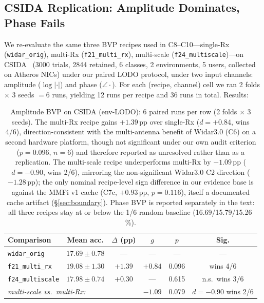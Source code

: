 \documentclass[journal,11pt]{IEEEtran}
\begin{document}
\subsection{CSIDA Replication: Amplitude Dominates, Phase Fails}
\label{sec:csida}

We re-evaluate the same three BVP recipes used in C8--C10---single-Rx (\texttt{widar\_orig}), multi-Rx (\texttt{f21\_multi\_rx}), multi-scale (\texttt{f24\_multiscale})---on CSIDA~\cite{csida2022} (3000 trials, 2844 retained, 6 classes, 2 environments, 5 users, collected on Atheros NICs) under our paired LODO protocol, under two input channels: amplitude ($\log|\cdot|$) and phase ($\angle \cdot$). For each (recipe, channel) cell we ran 2 folds $\times$ 3 seeds $= 6$ runs, yielding 12 runs per recipe and 36 runs in total. Results:

\begin{table}[!t]
    \centering
    \caption{Amplitude BVP on CSIDA (env-LODO): 6 paired runs per row (2 folds $\times$ 3 seeds). The multi-Rx recipe gains $+1.39$\,pp over single-Rx ($d{=}+0.84$, wins 4/6), direction-consistent with the multi-antenna benefit of Widar3.0 (C6) on a second hardware platform, though not significant under our own audit criterion ($p = 0.096$, $n = 6$) and therefore reported as unresolved rather than as a replication. The multi-scale recipe underperforms multi-Rx by $-1.09$\,pp ($d{=}-0.90$, wins 2/6), mirroring the non-significant Widar3.0 C2 direction ($-1.28$\,pp); the only nominal recipe-level sign difference in our evidence base is against the MMFi v1 cache (C7c, $+0.93$\,pp, $p = 0.116$), itself a documented cache artifact (\S\ref{sec:boundary}). Phase BVP is reported separately in the text: all three recipes stay at or below the 1/6 random baseline (16.69/15.79/15.26\,\%).}
    \label{tab:csida}
    \setlength{\tabcolsep}{6pt}
    \footnotesize
    \begin{tabular}{@{}l c c c c c@{}}
    \toprule
    Comparison & Mean acc. & $\Delta$ (pp) & $g$ & $p$ & Sig. \\
    \midrule
    \texttt{widar\_orig}     & $17.69 \pm 0.78$ & ---        & ---  & ---  & --- \\
    \texttt{f21\_multi\_rx}  & $\mathbf{19.08 \pm 1.30}$ & $+1.39$  & $+0.84$ & 0.096 & wins 4/6 \\
    \texttt{f24\_multiscale} & $17.98 \pm 0.74$ & $+0.30$   & ---     & 0.615 & n.s.\ wins 3/6 \\
    \midrule
    \multicolumn{3}{l}{\emph{multi-scale vs.\ multi-Rx:}} & $-1.09$ & 0.079 & $d{=}-0.90$ wins 2/6 \\
    \bottomrule
    \end{tabular}
\end{table}
\end{document}
